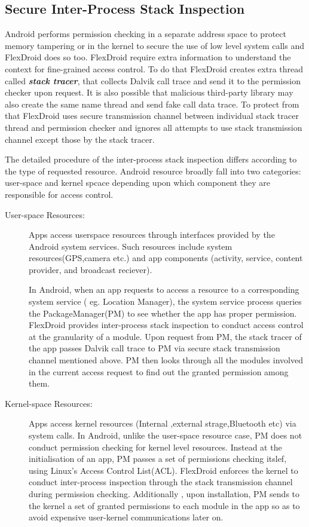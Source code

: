 \documentclass[11pt]{report}
\begin{document}
\subsection{Secure Inter-Process Stack Inspection}
\par Android performs permission checking in a separate address space to protect memory tampering or in the kernel to secure the use of low level system calls and FlexDroid does so too.
FlexDroid require extra information to understand the context for fine-grained access control. To do that FlexDroid creates extra thread called \textbf{\it stack tracer},  that collects Dalvik 
call trace and send it to the permission checker upon request. It is also possible that malicious third-party library may also create the same name thread and send fake call data 
trace. To protect from that FlexDroid uses secure transmission channel between individual stack tracer thread and permission checker and ignores all attempts to use stack transmission
channel except those by the stack tracer.
\par The detailed procedure of the inter-process stack inspection differs according to the type of requested resource. Android resource broadly fall into two categories: user-space and kernel spcace depending upon which component they are responsible for access control.
\begin{description}
\item [User-space Resources:]
\par Apps access userspace resources through interfaces provided by the Android system services. Such resources include system resources(GPS,camera etc.) and app components 
(activity, service, content provider, and broadcast reciever).
\par In Android, when an app requests to access a resource to a corresponding system service ( eg. Location Manager), the system service process queries the PackageManager(PM) to 
see whether  the app has proper permission. FlexDroid provides inter-process stack inspection to conduct access control at the granularity of a module. Upon request from PM, the 
stack tracer of the app passes Dalvik call trace to PM via secure stack transmission channel mentioned above. PM then looks through all the modules involved in the current access 
request to find out the granted permission among them.
\item [Kernel-space Resources:]
\par Apps access kernel resources (Internal ,external strage,Bluetooth etc) via system calls. In Android, unlike the user-space resource case, PM does not conduct permission 
checking  for kernel level resources. Instead at the initialisation of an app, PM passes a set of permissions checking itslef, using Linux’s Access Control List(ACL). FlexDroid 
enforces the kernel to conduct inter-process inspection through the stack transmission channel during permission checking. Additionally , upon installation, PM sends to the kernel 
a set of granted permissions to each module in the app so as to avoid expensive user-kernel communications later on.
\end{description}
\end{document}
